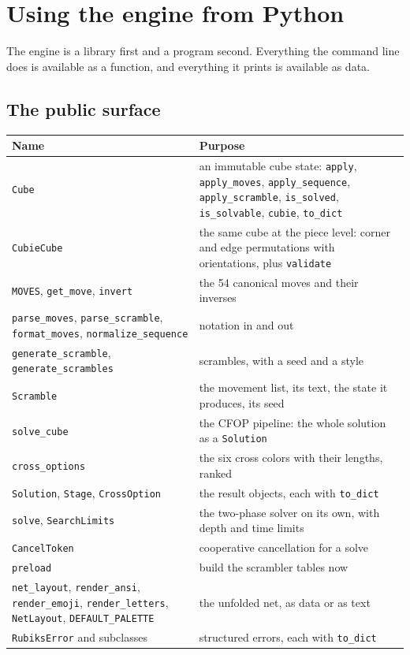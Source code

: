 \section{Using the engine from Python}
\label{sec:library}

The engine is a library first and a program second.  Everything the command line
does is available as a function, and everything it prints is available as data.

\subsection{The public surface}

\begin{longtable}{@{}p{4.6cm}p{9.8cm}@{}}
\toprule
Name & Purpose \\
\midrule
\endhead
\texttt{Cube} & an immutable cube state: \texttt{apply}, \texttt{apply\_moves},
\texttt{apply\_sequence}, \texttt{apply\_scramble}, \texttt{is\_solved},
\texttt{is\_solvable}, \texttt{cubie}, \texttt{to\_dict} \\
\texttt{CubieCube} & the same cube at the piece level: corner and edge permutations
with orientations, plus \texttt{validate} \\
\texttt{MOVES}, \texttt{get\_move}, \texttt{invert} & the 54 canonical moves and
their inverses \\
\texttt{parse\_moves}, \texttt{parse\_scramble}, \texttt{format\_moves},
\texttt{normalize\_sequence} & notation in and out \\
\texttt{generate\_scramble}, \texttt{generate\_scrambles} & scrambles, with a seed
and a style \\
\texttt{Scramble} & the movement list, its text, the state it produces, its seed \\
\texttt{solve\_cube} & the CFOP pipeline: the whole solution as a \texttt{Solution} \\
\texttt{cross\_options} & the six cross colors with their lengths, ranked \\
\texttt{Solution}, \texttt{Stage}, \texttt{CrossOption} & the result objects, each
with \texttt{to\_dict} \\
\texttt{solve}, \texttt{SearchLimits} & the two-phase solver on its own, with depth
and time limits \\
\texttt{CancelToken} & cooperative cancellation for a solve \\
\texttt{preload} & build the scrambler tables now \\
\texttt{net\_layout}, \texttt{render\_ansi}, \texttt{render\_emoji},
\texttt{render\_letters}, \texttt{NetLayout}, \texttt{DEFAULT\_PALETTE} & the
unfolded net, as data or as text \\
\texttt{RubiksError} and subclasses & structured errors, each with
\texttt{to\_dict} \\
\bottomrule
\end{longtable}

